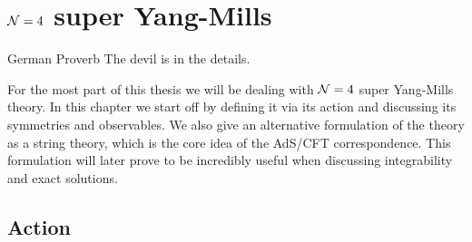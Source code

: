 
\section{$\mathcal{N}=4$ super Yang-Mills}
\label{sec:cft}

\begin{chapquote}{German Proverb}
The devil is in the details.
\end{chapquote}

\noindent For the most part of this thesis we will be dealing with $\mathcal{N}=4$ super Yang-Mills theory. 
In this chapter we start off by defining it via its action and discussing its symmetries and observables. 
We also give an alternative formulation of the theory as a string theory, which is the core idea of the AdS/CFT correspondence. 
This formulation will later prove to be incredibly useful when discussing integrability and exact solutions.

\subsection{Action}

